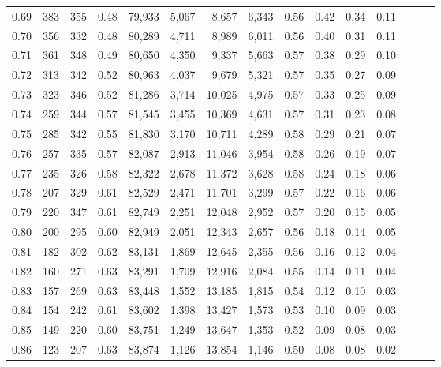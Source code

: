 \begin{tabular}{rrrrrrrrrrrrrrr}
0.69 &    383 &  355 &  0.48 &  79,933 &   5,067 &   8,657 &   6,343 &  0.56 &  0.42 &  0.34 &      0.11 \\
0.70 &    356 &  332 &  0.48 &  80,289 &   4,711 &   8,989 &   6,011 &  0.56 &  0.40 &  0.31 &      0.11 \\
0.71 &    361 &  348 &  0.49 &  80,650 &   4,350 &   9,337 &   5,663 &  0.57 &  0.38 &  0.29 &      0.10 \\
0.72 &    313 &  342 &  0.52 &  80,963 &   4,037 &   9,679 &   5,321 &  0.57 &  0.35 &  0.27 &      0.09 \\
0.73 &    323 &  346 &  0.52 &  81,286 &   3,714 &  10,025 &   4,975 &  0.57 &  0.33 &  0.25 &      0.09 \\
0.74 &    259 &  344 &  0.57 &  81,545 &   3,455 &  10,369 &   4,631 &  0.57 &  0.31 &  0.23 &      0.08 \\
0.75 &    285 &  342 &  0.55 &  81,830 &   3,170 &  10,711 &   4,289 &  0.58 &  0.29 &  0.21 &      0.07 \\
0.76 &    257 &  335 &  0.57 &  82,087 &   2,913 &  11,046 &   3,954 &  0.58 &  0.26 &  0.19 &      0.07 \\
0.77 &    235 &  326 &  0.58 &  82,322 &   2,678 &  11,372 &   3,628 &  0.58 &  0.24 &  0.18 &      0.06 \\
0.78 &    207 &  329 &  0.61 &  82,529 &   2,471 &  11,701 &   3,299 &  0.57 &  0.22 &  0.16 &      0.06 \\
0.79 &    220 &  347 &  0.61 &  82,749 &   2,251 &  12,048 &   2,952 &  0.57 &  0.20 &  0.15 &      0.05 \\
0.80 &    200 &  295 &  0.60 &  82,949 &   2,051 &  12,343 &   2,657 &  0.56 &  0.18 &  0.14 &      0.05 \\
0.81 &    182 &  302 &  0.62 &  83,131 &   1,869 &  12,645 &   2,355 &  0.56 &  0.16 &  0.12 &      0.04 \\
0.82 &    160 &  271 &  0.63 &  83,291 &   1,709 &  12,916 &   2,084 &  0.55 &  0.14 &  0.11 &      0.04 \\
0.83 &    157 &  269 &  0.63 &  83,448 &   1,552 &  13,185 &   1,815 &  0.54 &  0.12 &  0.10 &      0.03 \\
0.84 &    154 &  242 &  0.61 &  83,602 &   1,398 &  13,427 &   1,573 &  0.53 &  0.10 &  0.09 &      0.03 \\
0.85 &    149 &  220 &  0.60 &  83,751 &   1,249 &  13,647 &   1,353 &  0.52 &  0.09 &  0.08 &      0.03 \\
0.86 &    123 &  207 &  0.63 &  83,874 &   1,126 &  13,854 &   1,146 &  0.50 &  0.08 &  0.08 &      0.02 \\

\end{tabular}
